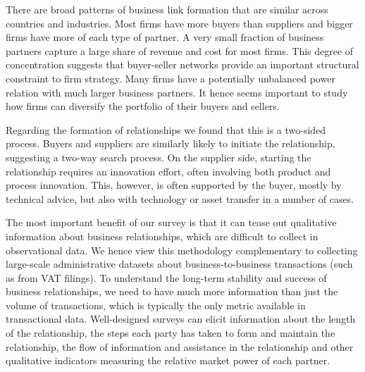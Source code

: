 \documentclass[final, dvipsnames, authoryear,12pt]{elsarticle}
\begin{document}
There are broad patterns of business link formation that are similar across countries and industries. Most firms have more buyers than suppliers and bigger firms have more of each type of partner. A very small fraction of business partners capture a large share of revenue and cost for most firms. This degree of concentration suggests that buyer-seller networks provide an important structural constraint to firm strategy. Many firms have a potentially unbalanced power relation with much larger business partners. It hence seems important to study how firms can diversify the portfolio of their buyers and sellers.

Regarding the formation of relationships we found that this is a two-sided process. Buyers and suppliers are similarly likely to initiate the relationship, suggesting a two-way search process. On the supplier side, starting the relationship requires an innovation effort, often involving both product and process innovation. This, however, is often supported by the buyer, mostly by technical advice, but also with technology or asset transfer in a number of cases.

The most important benefit of our survey is that it can tease out qualitative information about business relationships, which are difficult to collect in observational data. We hence view this methodology complementary to collecting large-scale administrative datasets about business-to-business transactions (such as from VAT filings). To understand the long-term stability and success of business relationships, we need to have much more information than just the volume of transactions, which is typically the only metric available in transactional data. Well-designed surveys can elicit information about the length of the relationship, the steps each party has taken to form and maintain the relationship, the flow of information and assistance in the relationship and other qualitative indicators measuring the relative market power of each partner.
\end{document}
